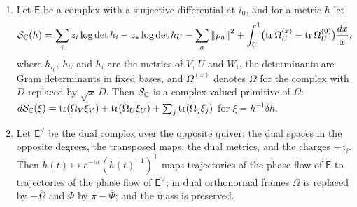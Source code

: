 \begin{proposition}\label{prop:usedc}
\begin{enumerate}
\item[(a)] \cite[Theorem~3.4]{wue26c} Let $\mathsf E$ be a complex with a
 surjective differential at $i_0$, and for a metric $h$ let
 \begin{equation}\label{eq:primitive}
 \mathcal S_{\mathbb C}(h)=\sum_iz_i\log\det h_i-z_\ast\log\det h_U-\sum_a\left\lVert\rho_a\right\rVert^2
 +\int_0^1\bigl(\operatorname{tr}\Omega_U^{(x)}-\operatorname{tr}\Omega_U^{(0)}\bigr)\frac{dx}x,
 \end{equation}
 where $h_{i_0}$, $h_U$ and $h_i$ are the metrics of $V$, $U$ and $W_i$, the
 determinants are Gram determinants in fixed bases, and $\Omega^{(x)}$
 denotes $\Omega$ for the complex with $D$ replaced by $\sqrt x\,D$. Then
 $\mathcal S_{\mathbb C}$ is a complex-valued primitive of $\Omega$:
 $d\mathcal S_{\mathbb C}(\xi)=\operatorname{tr}(\Omega_V\xi_V)+\operatorname{tr}(\Omega_U\xi_U)+\sum_j\operatorname{tr}(\Omega_j\xi_j)$
 for $\xi=h^{-1}\delta h$.
\item[(b)] \cite[Theorem~5.1]{wue26c} Let $\mathsf E^\vee$ be the dual
 complex over the opposite quiver: the dual spaces in the opposite degrees,
 the transposed maps, the dual metrics, and the charges $-\overline{z_i}$.
 Then $h(t)\mapsto e^{-\pi t}(h(t)^{-1})^{\mathsf T}$ maps trajectories of
 the phase flow of $\mathsf E$ to trajectories of the phase flow of
 $\mathsf E^\vee$; in dual orthonormal frames $\Omega$ is replaced by
 $-\overline\Omega$ and $\Phi$ by $\pi-\overline\Phi$; and the mass is
 preserved.
\end{enumerate}
\end{proposition}
